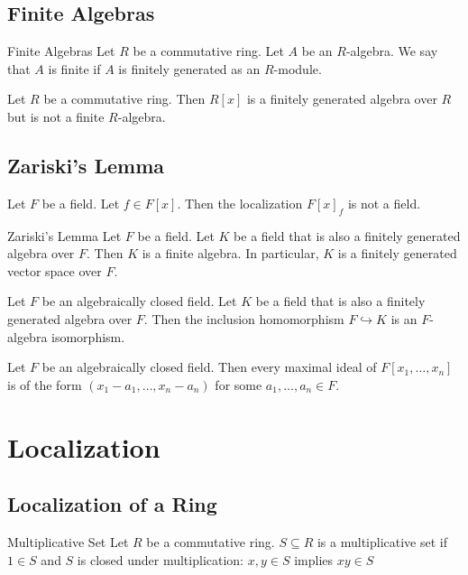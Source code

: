 \documentclass[a4paper]{article}
\begin{document}
\subsection{Finite Algebras}
\begin{defn}{Finite Algebras}{} Let $R$ be a commutative ring. Let $A$ be an $R$-algebra. We say that $A$ is finite if $A$ is finitely generated as an $R$-module. 
\end{defn}

\begin{eg}{}{} Let $R$ be a commutative ring. Then $R[x]$ is a finitely generated algebra over $R$ but is not a finite $R$-algebra. 
\end{eg}

\subsection{Zariski's Lemma}
\begin{lmm}{}{} Let $F$ be a field. Let $f\in F[x]$. Then the localization $F[x]_f$ is not a field. 
\end{lmm}

\begin{thm}{Zariski's Lemma}{} Let $F$ be a field. Let $K$ be a field that is also a finitely generated algebra over $F$. Then $K$ is a finite algebra. In particular, $K$ is a finitely generated vector space over $F$. 
\end{thm}

\begin{crl}{}{} Let $F$ be an algebraically closed field. Let $K$ be a field that is also a finitely generated algebra over $F$. Then the inclusion homomorphism $F\hookrightarrow K$ is an $F$-algebra isomorphism. 
\end{crl}

\begin{crl}{}{} Let $F$ be an algebraically closed field. Then every maximal ideal of $F[x_1,\dots,x_n]$ is of the form $(x_1-a_1,\dots,x_n-a_n)$ for some $a_1,\dots,a_n\in F$. 
\end{crl}

\pagebreak
\section{Localization}
\subsection{Localization of a Ring}
\begin{defn}{Multiplicative Set}{} Let $R$ be a commutative ring. $S\subseteq R$ is a multiplicative set if $1\in S$ and $S$ is closed under multiplication: $x,y\in S$ implies $xy\in S$
\end{defn}
\end{document}
